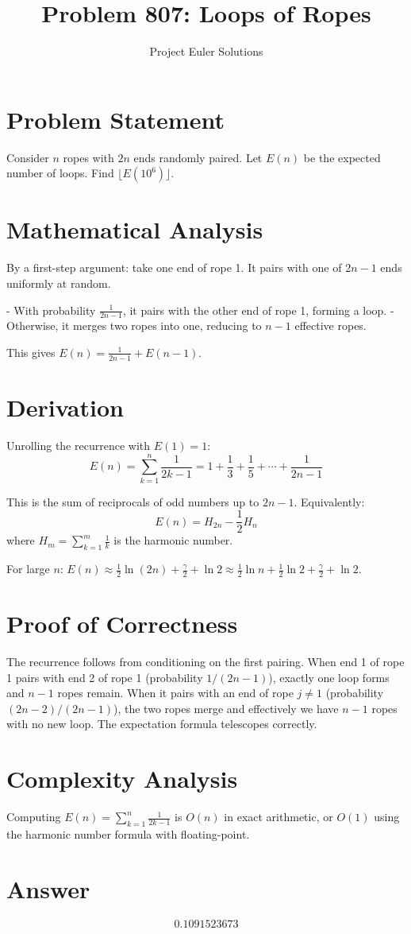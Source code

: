 \documentclass[11pt]{article}
\title{Problem 807: Loops of Ropes}
\author{Project Euler Solutions}
\date{}
\begin{document}
\maketitle

\section{Problem Statement}
Consider $n$ ropes with $2n$ ends randomly paired. Let $E(n)$ be the expected number of loops. Find $\lfloor E(10^6) \rfloor$.

\section{Mathematical Analysis}
By a first-step argument: take one end of rope 1. It pairs with one of $2n-1$ ends uniformly at random.

- With probability $\frac{1}{2n-1}$, it pairs with the other end of rope 1, forming a loop.
- Otherwise, it merges two ropes into one, reducing to $n-1$ effective ropes.

This gives $E(n) = \frac{1}{2n-1} + E(n-1)$.

\section{Derivation}
Unrolling the recurrence with $E(1) = 1$:
$$E(n) = \sum_{k=1}^{n} \frac{1}{2k-1} = 1 + \frac{1}{3} + \frac{1}{5} + \cdots + \frac{1}{2n-1}$$

This is the sum of reciprocals of odd numbers up to $2n-1$. Equivalently:
$$E(n) = H_{2n} - \frac{1}{2}H_n$$
where $H_m = \sum_{k=1}^{m}\frac{1}{k}$ is the harmonic number.

For large $n$: $E(n) \approx \frac{1}{2}\ln(2n) + \frac{\gamma}{2} + \ln 2 \approx \frac{1}{2}\ln n + \frac{1}{2}\ln 2 + \frac{\gamma}{2} + \ln 2$.

\section{Proof of Correctness}
The recurrence follows from conditioning on the first pairing. When end 1 of rope 1 pairs with end 2 of rope 1 (probability $1/(2n-1)$), exactly one loop forms and $n-1$ ropes remain. When it pairs with an end of rope $j \neq 1$ (probability $(2n-2)/(2n-1)$), the two ropes merge and effectively we have $n-1$ ropes with no new loop. The expectation formula telescopes correctly.

\section{Complexity Analysis}
Computing $E(n) = \sum_{k=1}^{n}\frac{1}{2k-1}$ is $O(n)$ in exact arithmetic, or $O(1)$ using the harmonic number formula with floating-point.

\section{Answer}

\[
\boxed{0.1091523673}
\]
\end{document}
